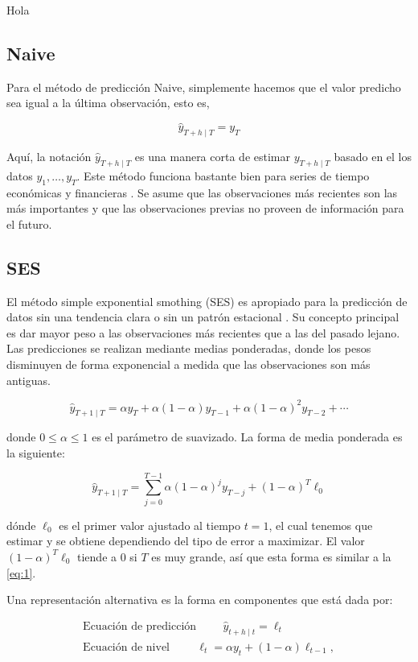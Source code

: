 Hola
\subsection{Naive}

Para el método de predicción Naive, simplemente hacemos que el valor predicho sea igual a la última observación, esto es,

\[ \hat{y}_{T+h \mid T}=y_{T} \]

Aquí, la notación $\hat{y}_{T+h \mid T}$ es una manera corta de estimar $y_{T+h \mid T}$ basado en el los datos $y_{1}, \ldots, y_{T}$. Este método funciona bastante bien para series de tiempo económicas y financieras \cite{hyndmanForecastingPrinciplesPractice}.
Se asume que las observaciones más recientes son las más importantes y que las observaciones previas no proveen de información para el futuro.

\subsection{SES}
El método simple exponential smothing (SES) es apropiado para la predicción de datos sin una tendencia clara o sin un patrón estacional \cite{hyndmanForecastingPrinciplesPractice}. Su concepto principal es dar mayor peso a las observaciones más recientes que a las del pasado lejano. Las predicciones se realizan mediante medias ponderadas, donde los pesos disminuyen de forma exponencial a medida que las observaciones son más antiguas.

\begin{equation}
	\hat{y}_{T+1 \mid T}=\alpha y_{T}+\alpha(1-\alpha) y_{T-1}+\alpha(1-\alpha)^{2} y_{T-2}+\cdots
	\label{eq:1}
\end{equation}

donde $0 \leq \alpha \leq 1$ es el parámetro de suavizado. La forma de media ponderada es la siguiente:

\[\hat{y}_{T+1 \mid T}=\sum_{j=0}^{T-1} \alpha(1-\alpha)^{j} y_{T-j}+(1-\alpha)^{T} \ell_{0}\]

dónde $\ell_{0}$ es el primer valor ajustado al tiempo $t=1$, el cual tenemos que estimar y se obtiene dependiendo del tipo de error a maximizar. El valor $(1-\alpha)^{T} \ell_{0}$ tiende a $0$ si $T$ es muy grande, así que esta forma es similar a la \autoref{eq:1}. 

Una representación alternativa es la forma en componentes que está dada por:

\begin{equation*}
	\begin{array}{lcl} 
		\textrm{Ecuación de predicción} \hspace{1cm} \hat{y}_{t+h \mid t}=\ell_{t}\\
		\textrm{Ecuación de nivel}\hspace{1cm} \ell_{t}=\alpha y_{t}+(1-\alpha) \ell_{t-1},
	\end{array} 
\end{equation*}


